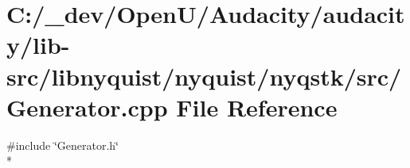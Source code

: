 \hypertarget{lib-src_2libnyquist_2nyquist_2nyqstk_2src_2_generator_8cpp}{}\section{C\+:/\+\_\+dev/\+Open\+U/\+Audacity/audacity/lib-\/src/libnyquist/nyquist/nyqstk/src/\+Generator.cpp File Reference}
\label{lib-src_2libnyquist_2nyquist_2nyqstk_2src_2_generator_8cpp}
{\ttfamily \#include \char`\"{}Generator.\+h\char`\"{}}\\*
